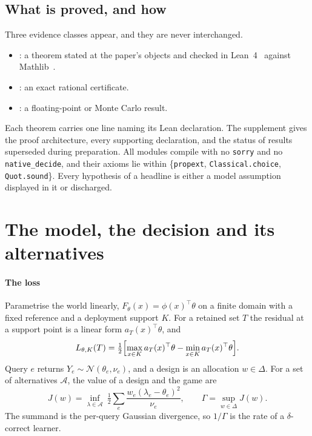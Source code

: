 \subsection{What is proved, and how}

Three evidence classes appear, and they are never interchanged.
\begin{itemize}
\item \PROVED: a theorem stated at the paper's objects and checked in
Lean~4~\cite{demoura2021} against Mathlib~\cite{mathlib2020}.
\item \CERT: an exact rational certificate.
\item \NUM: a floating-point or Monte Carlo result.
\end{itemize}
Each theorem carries one line naming its Lean declaration. The supplement gives the proof
architecture, every supporting declaration, and the status of results superseded during
preparation. All modules compile with no \texttt{sorry} and no \texttt{native\_decide}, and
their axioms lie within \{\texttt{propext}, \texttt{Classical.choice}, \texttt{Quot.sound}\}.
Every hypothesis of a headline is either a model assumption displayed in it or discharged.

\section{The model, the decision and its alternatives}
\label{sec:model}

\paragraph{The loss} Parametrise the world linearly, $F_{\theta}(x)=\phi(x)^{\top}\theta$ on a
finite domain with a fixed reference and a deployment support $K$. For a retained set $T$ the
residual at a support point is a linear form $a_{T}(x)^{\top}\theta$, and
\begin{equation}
L_{\theta,K}(T)=\tfrac12\Bigl[\max_{x\in K}a_{T}(x)^{\top}\theta
-\min_{x\in K}a_{T}(x)^{\top}\theta\Bigr].
\label{eq:loss}
\end{equation}
Query $e$ returns $Y_{e}\sim\mathcal N(\theta_{e},\nu_{e})$, and a design is an allocation
$w\in\Delta$. For a set of alternatives $\mathcal A$, the value of a design and the game are
\begin{equation}
J(w)=\inf_{\lambda\in\mathcal A}\ \tfrac12\sum_{e}\frac{w_{e}(\lambda_{e}-\theta_{e})^{2}}{\nu_{e}},
\qquad \Gamma=\sup_{w\in\Delta}J(w).
\label{eq:game}
\end{equation}
The summand is the per-query Gaussian divergence, so $1/\Gamma$ is the rate of a
$\delta$-correct learner.

